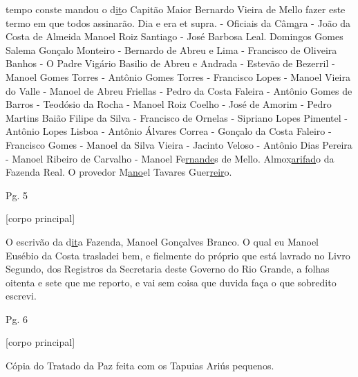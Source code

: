 \begin{refsection}
tempo conste mandou o d\underline{it}o Capitão Maior Bernardo Vieira de Mello fazer este termo em que todos assinarão. Dia e era et supra. - Oficiais da Câm\underline{a}ra - João da Costa de Almeida Manoel Roiz Santiago - José Barbosa Leal. Domingos Gomes Salema Gonçalo Monteiro - Bernardo de Abreu e Lima - Francisco de Oliveira Banhos - O Padre Vigário Basilio de Abreu e Andrada - Estevão de Bezerril - Manoel Gomes Torres - Antônio Gomes Torres - Francisco Lopes - Manoel Vieira do Valle - Manoel de Abreu Friellas - Pedro da Costa Faleira - Antônio Gomes de Barros - Teodósio da Rocha - Manoel Roiz Coelho - José de Amorim - Pedro Martins Baião Filipe da Silva - Francisco de Ornelas - Sipriano Lopes Pimentel - Antônio Lopes Lisboa - Antônio Álvares Correa - Gonçalo da Costa Faleiro - Francisco Gomes - Manoel da Silva Vieira - Jacinto Veloso - Antônio Dias Pereira - Manoel Ribeiro de Carvalho - Manoel Fe\underline{rnande}s de Mello. Almox\underline{arifad}o da Fazenda Real. O provedor M\underline{ano}el Tavares Guer\underline{reir}o.  


    \vspace{5mm}

    \noindent{}Pg. 5

    \vspace{1ex}

    \noindent{}[corpo principal] 

    \vspace{1ex}

    O escrivão da d\underline{it}a Fazenda, Manoel Gonçalves Branco. O qual eu Manoel Eusébio da Costa trasladei bem, e fielmente do próprio que está lavrado no Livro Segundo, dos Registros da Secretaria deste Governo do Rio Grande, a folhas oitenta e sete que me reporto, e vai sem coisa que duvida faça o que sobredito escrevi. 


    \vspace{5mm}

    \noindent{}Pg. 6

    \vspace{1ex}

    \noindent{}[corpo principal] 

    \vspace{1ex}

    Cópia do Tratado da Paz feita com os Tapuias Ariús pequenos. 


\end{refsection}
